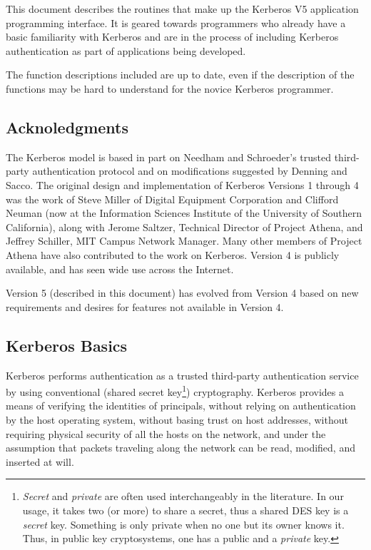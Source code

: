 	This document describes the routines that make up the Kerberos
V5 application programming interface.  It is geared towards
programmers who already have a basic familiarity with Kerberos and are
in the process of including Kerberos authentication as part of 
applications being developed.

	The function descriptions included are up to date, even if the
description of the functions may be hard to understand for the novice
Kerberos programmer.

\subsection{Acknoledgments}


The Kerberos model is based in part on Needham and Schroeder's trusted
third-party authentication protocol and on modifications suggested by
Denning and Sacco.  The original design and implementation of Kerberos
Versions 1 through 4 was the work of Steve Miller of Digital Equipment
Corporation and Clifford Neuman (now at the Information Sciences
Institute of the University of Southern California), along with Jerome
Saltzer, Technical Director of Project Athena, and Jeffrey Schiller,
MIT Campus Network Manager.  Many other members of Project Athena have
also contributed to the work on Kerberos.  Version 4 is publicly
available, and has seen wide use across the Internet.

Version 5 (described in this document) has evolved from Version 4 based
on new requirements and desires for features not available in Version 4.


\subsection{Kerberos Basics}

Kerberos performs authentication as a trusted third-party
authentication service by using conventional (shared secret
key\footnote{ {\em Secret} and {\em private} are often used
interchangeably in the literature.  In our usage, it takes two (or
more) to share a secret, thus a shared DES key is a {\em secret} key.
Something is only private when no one but its owner knows it.  Thus,
in public key cryptosystems, one has a public and a {\em private} key.
}) cryptography.  Kerberos provides a means of verifying the
identities of principals, without relying on authentication by the
host operating system, without basing trust on host addresses, without
requiring physical security of all the hosts on the network, and under
the assumption that packets traveling along the network can be read,
modified, and inserted at will.

